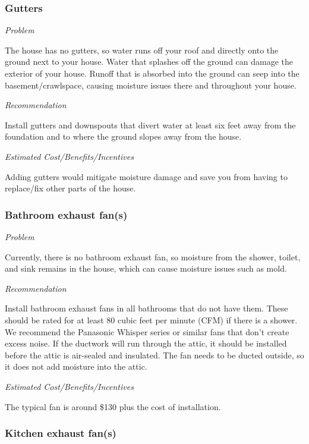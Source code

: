 \documentclass[
  letterpaper,
  DIV=11,
  numbers=noendperiod]{scrartcl}
\begin{document}
\subsubsection{Gutters}\label{gutters}

\emph{Problem}

The house has no gutters, so water runs off your roof and directly onto
the ground next to your house. Water that splashes off the ground can
damage the exterior of your house. Runoff that is absorbed into the
ground can seep into the basement/crawlspace, causing moisture issues
there and throughout your house.

\emph{Recommendation}

Install gutters and downspouts that divert water at least six feet away
from the foundation and to where the ground slopes away from the house.

\emph{Estimated Cost/Benefits/Incentives}

Adding gutters would mitigate moisture damage and save you from having
to replace/fix other parts of the house.

\subsubsection{Bathroom exhaust fan(s)}\label{bathroom-exhaust-fans}

\emph{Problem}

Currently, there is no bathroom exhaust fan, so moisture from the
shower, toilet, and sink remains in the house, which can cause moisture
issues such as mold.

\emph{Recommendation}

Install bathroom exhaust fans in all bathrooms that do not have them.
These should be rated for at least 80 cubic feet per minute (CFM) if
there is a shower. We recommend the Panasonic Whisper series or similar
fans that don't create excess noise. If the ductwork will run through
the attic, it should be installed before the attic is air-sealed and
insulated. The fan needs to be ducted outside, so it does not add
moisture into the attic.

\emph{Estimated Cost/Benefits/Incentives}

The typical fan is around \$130 plus the cost of installation.

\subsubsection{Kitchen exhaust fan(s)}\label{kitchen-exhaust-fans}
\end{document}
